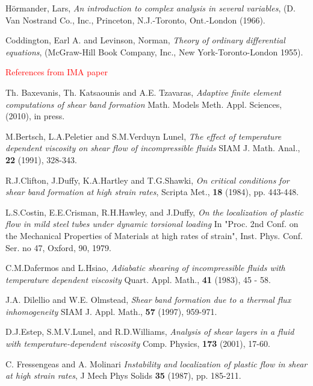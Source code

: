 \documentclass[a4paper,11pt]{article}
\newcommand{\tcr}{\textcolor{red}}
\theoremstyle{remark}
\begin{document}
\begin{thebibliography}{10}

{\sc H\"ormander, Lars},
{\it An introduction to complex analysis in several variables},
(D. Van Nostrand Co., Inc., Princeton, N.J.-Toronto, Ont.-London (1966).

{\sc Coddington, Earl A. and Levinson, Norman},
{\it Theory of ordinary differential equations},
(McGraw-Hill Book Company, Inc., New York-Toronto-London 1955).



\tcr{ References from IMA paper}


{\sc Th. Baxevanis, Th. Katsaounis and A.E. Tzavaras},
{\sl Adaptive finite element computations of shear band formation}
Math. Models Meth. Appl. Sciences, (2010), in press.


{\sc M.Bertsch, L.A.Peletier and S.M.Verduyn Lunel},
{\sl The effect of temperature dependent viscosity on shear flow of incompressible fluids}
\newblock SIAM J. Math. Anal., {\bf 22} (1991), 328-343.


{\sc R.J.Clifton, J.Duffy, K.A.Hartley and T.G.Shawki},
{\sl On critical conditions for shear band formation at high strain rates}, Scripta Met., {\bf 18} (1984), pp. 443-448.

{\sc L.S.Costin, E.E.Crisman, R.H.Hawley, and J.Duffy},
{\sl On the localization of plastic flow in mild steel tubes under dynamic torsional loading}
 In "Proc. 2nd Conf. on the Mechanical Properties of Materials at high rates of strain",
 Inst. Phys. Conf. Ser. no 47, Oxford, 90, 1979.

{\sc C.M.Dafermos and L.Hsiao},
{\sl Adiabatic shearing of incompressible fluids with temperature dependent viscosity}
Quart. Appl. Math., {\bf 41} (1983), 45 - 58.


{\sc J.A. Dilellio and W.E. Olmstead},
{\sl Shear band formation due to a thermal flux inhomogeneity}
SIAM J. Appl. Math., {\bf 57} (1997), 959-971.

{\sc D.J.Estep, S.M.V.Lunel, and R.D.Williams},
{\sl Analysis of shear layers in a fluid with temperature-dependent viscosity}
\newblock Comp. Physics, {\bf 173} (2001), 17-60.


{\sc C. Fressengeas and A. Molinari }
{\sl Instability and localization of plastic flow in shear at high strain rates}, J Mech Phys Solids {\bf 35} (1987), pp. 185-211.


\end{thebibliography}
\end{document}
